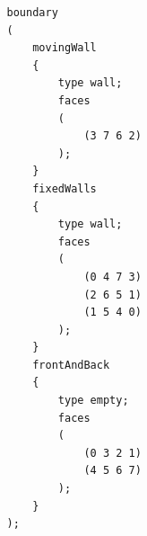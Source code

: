 \begin{frame}[fragile]
\begin{columns}
        
        \tiny
        \begin{verbatim}
                boundary
                (
                    movingWall
                    {
                        type wall;
                        faces
                        (
                            (3 7 6 2)
                        );
                    }
                    fixedWalls
                    {
                        type wall;
                        faces
                        (
                            (0 4 7 3)
                            (2 6 5 1)
                            (1 5 4 0)
                        );
                    }
                    frontAndBack
                    {
                        type empty;
                        faces
                        (
                            (0 3 2 1)
                            (4 5 6 7)
                        );
                    }
                );                    
        \end{verbatim}
        
    \end{columns}
    


\end{frame} 








